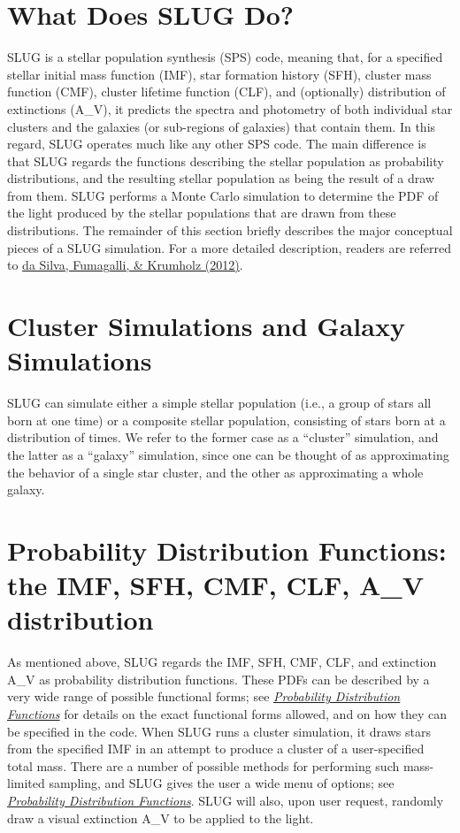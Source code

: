 \documentclass[letterpaper,10pt,english]{sphinxmanual}
\begin{document}
\section{What Does SLUG Do?}
\label{intro:what-does-slug-do}
SLUG is a stellar population synthesis (SPS) code, meaning that, for a specified stellar initial mass function (IMF), star formation history (SFH), cluster mass function (CMF), cluster lifetime function (CLF), and (optionally) distribution of extinctions (A\_V), it predicts the spectra and photometry of both individual star clusters and the galaxies (or sub-regions of galaxies) that contain them. In this regard, SLUG operates much like any other SPS code. The main difference is that SLUG regards the functions describing the stellar population as probability distributions, and the resulting stellar population as being the result of a draw from them. SLUG performs a Monte Carlo simulation to determine the PDF of the light produced by the stellar populations that are drawn from these distributions. The remainder of this section briefly describes the major conceptual pieces of a SLUG simulation. For a more detailed description, readers are referred to \href{http://adsabs.harvard.edu/abs/2012ApJ...745..145D}{da Silva, Fumagalli, \& Krumholz (2012)}.


\section{Cluster Simulations and Galaxy Simulations}
\label{intro:cluster-simulations-and-galaxy-simulations}
SLUG can simulate either a simple stellar population (i.e., a group of stars all born at one time) or a composite stellar population, consisting of stars born at a distribution of times. We refer to the former case as a ``cluster'' simulation, and the latter as a ``galaxy'' simulation, since one can be thought of as approximating the behavior of a single star cluster, and the other as approximating a whole galaxy.


\section{Probability Distribution Functions: the IMF, SFH, CMF, CLF, A\_V distribution}
\label{intro:probability-distribution-functions-the-imf-sfh-cmf-clf-a-v-distribution}\label{intro:ssec-slugpdfs}
As mentioned above, SLUG regards the IMF, SFH, CMF, CLF, and extinction A\_V as probability distribution functions. These PDFs can be described by a very wide range of possible functional forms; see {\hyperref[pdfs:sec-pdfs]{\emph{Probability Distribution Functions}}} for details on the exact functional forms allowed, and on how they can be specified in the code. When SLUG runs a cluster simulation, it draws stars from the specified IMF in an attempt to produce a cluster of a user-specified total mass. There are a number of possible methods for performing such mass-limited sampling, and SLUG gives the user a wide menu of options; see {\hyperref[pdfs:sec-pdfs]{\emph{Probability Distribution Functions}}}. SLUG will also, upon user request, randomly draw a visual extinction A\_V to be applied to the light.
\end{document}
